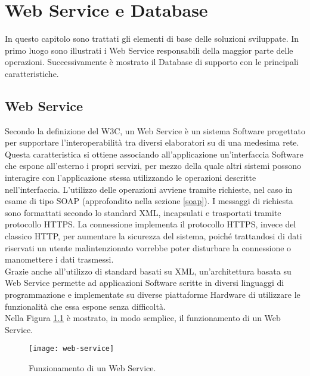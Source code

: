 
\chapter{Web Service e Database}
\label{cap:sviluppo-software}

In questo capitolo sono trattati gli elementi di base delle soluzioni sviluppate. In primo luogo sono illustrati i Web Service responsabili della maggior parte delle operazioni. Successivamente è mostrato il Database di supporto con le principali caratteristiche.


\section{Web Service}

Secondo la definizione del \gls{W3C}, un Web Service è un sistema Software progettato per supportare l'interoperabilità tra diversi elaboratori su di una medesima rete.
Questa caratteristica si ottiene associando all'applicazione un'interfaccia Software che espone all'esterno i propri servizi, per mezzo della quale altri sistemi possono interagire con l'applicazione stessa utilizzando le operazioni descritte nell'interfaccia. L'utilizzo delle operazioni avviene tramite richieste, nel caso in esame di tipo SOAP (approfondito nella sezione \ref{soap}). I messaggi di richiesta sono formattati secondo lo standard \gls{XML}, incapsulati e trasportati tramite protocollo HTTPS. 
La connessione implementa il protocollo HTTPS, invece del classico HTTP, per aumentare la sicurezza del sistema, poiché trattandosi di dati riservati un utente malintenzionato vorrebbe poter disturbare la connessione o manomettere i dati trasmessi.\\
Grazie anche all'utilizzo di standard basati su XML, un'architettura basata su Web Service permette ad applicazioni Software scritte in diversi linguaggi di programmazione e implementate su diverse piattaforme Hardware di utilizzare le funzionalità che essa espone senza difficoltà.
\\Nella Figura \ref{webservice} è mostrato, in modo semplice, il funzionamento di un Web Service.

\begin{figure}[!h] 
    \centering 
    \texttt{[image: web-service]} 
    \caption{Funzionamento di un Web Service.}
    \label{webservice}
\end{figure}


